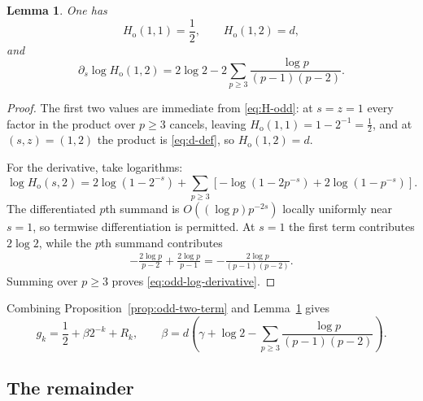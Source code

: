 \documentclass[11pt]{amsart}
\theoremstyle{plain}
\newtheorem{lemma}[theorem]{Lemma}
\theoremstyle{definition}
\begin{document}
\begin{lemma}\label{lem:odd-constants}
One has
\begin{equation}\label{eq:odd-H-values}
  H_{\mathrm o}(1,1)=\frac12,
  \qquad
  H_{\mathrm o}(1,2)=d,
\end{equation}
and
\begin{equation}\label{eq:odd-log-derivative}
  \partial_s\log H_{\mathrm o}(1,2)
   =2\log2-2\sum_{p\geq3}\frac{\log p}{(p-1)(p-2)}.
\end{equation}
\end{lemma}

\begin{proof}
The first two values are immediate from \eqref{eq:H-odd}: at $s=z=1$ every
factor in the product over $p\geq3$ cancels, leaving
$H_{\mathrm o}(1,1)=1-2^{-1}=\tfrac12$, and at $(s,z)=(1,2)$ the product is
\eqref{eq:d-def}, so $H_{\mathrm o}(1,2)=d$.

For the derivative, take logarithms:
\[
 \log H_{\mathrm o}(s,2)
 =2\log(1-2^{-s})
  +\sum_{p\geq3}
     \left[-\log(1-2p^{-s})+2\log(1-p^{-s})\right].
\]
The differentiated $p$th summand is $O((\log p)p^{-2s})$ locally uniformly
near $s=1$, so termwise differentiation is permitted. At $s=1$ the first term
contributes $2\log2$, while the $p$th summand contributes
\begin{align*}
 -\frac{2\log p}{p-2}+\frac{2\log p}{p-1}
 =-\frac{2\log p}{(p-1)(p-2)}.
\end{align*}
Summing over $p\geq3$ proves \eqref{eq:odd-log-derivative}.
\end{proof}

Combining Proposition~\ref{prop:odd-two-term} and
Lemma~\ref{lem:odd-constants} gives
\begin{equation}\label{eq:odd-expansion}
  g_k=\frac12+\beta2^{-k}+R_k,
  \qquad
  \beta=d\left(\gamma+\log2-
  \sum_{p\geq3}\frac{\log p}{(p-1)(p-2)}\right).
\end{equation}

\subsection{The remainder}
\end{document}
